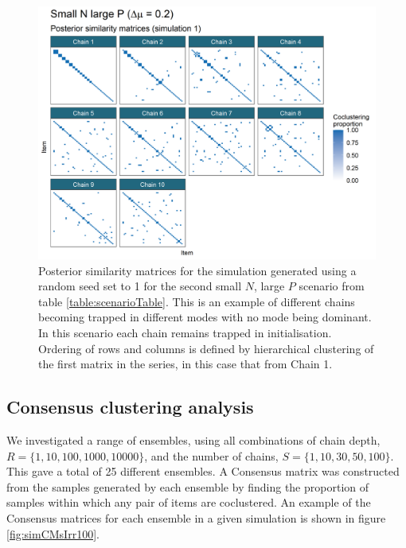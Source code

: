 \documentclass[]{article}
\begin{document}
\begin{figure} %
	\centering
	\includegraphics[scale=0.65]{./Images/Simulations/PSMs/small_n_large_p_small_dmSim1.png}
	\caption{Posterior similarity matrices for the simulation generated using a random seed set to 1 for the second small $N$, large $P$ scenario from table \ref{table:scenarioTable}. This is an example of different chains becoming trapped in different modes with no mode being dominant. In this scenario each chain remains trapped in initialisation. Ordering of rows and columns is defined by hierarchical clustering of the first matrix in the series, in this case that from Chain 1.}
	\label{fig:simPSMsPathologicalDisagreeExample}
\end{figure}

\newpage
\subsection{Consensus clustering analysis} 
We investigated a range of ensembles, using all combinations of chain depth, $R=\{1, 10, 100, 1000, 10000\}$, and the number of chains, $S=\{1, 10, 30, 50, 100\}$. This gave a total of 25 different ensembles. A Consensus matrix was constructed from the samples generated by each ensemble by finding the proportion of samples within which any pair of items are coclustered. An example of the Consensus matrices for each ensemble in a given simulation is shown in figure \ref{fig:simCMsIrr100}. 
\end{document}
